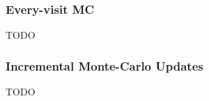 \subsubsection{Every-visit MC}\label{subsubsec:every-visit-mc}
TODO
%

\subsubsection{Incremental Monte-Carlo Updates}\label{subsubsec:incremental-monte-carlo-updates}
TODO
%


